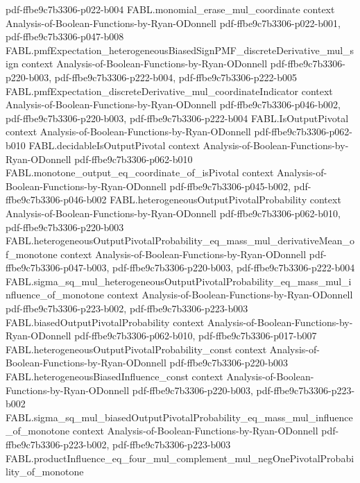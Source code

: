 \begin{theorem}
  {pdf-ffbe9c7b3306-p022-b004}
\proofstep
  {FABL.monomial_erase_mul_coordinate}
  {context}
  {Analysis-of-Boolean-Functions-by-Ryan-ODonnell}
  {pdf-ffbe9c7b3306-p022-b001,
    pdf-ffbe9c7b3306-p047-b008}
\proofstep
  {FABL.pmfExpectation_heterogeneousBiasedSignPMF_discreteDerivative_mul_sign}
  {context}
  {Analysis-of-Boolean-Functions-by-Ryan-ODonnell}
  {pdf-ffbe9c7b3306-p220-b003,
    pdf-ffbe9c7b3306-p222-b004,
    pdf-ffbe9c7b3306-p222-b005}
\proofstep
  {FABL.pmfExpectation_discreteDerivative_mul_coordinateIndicator}
  {context}
  {Analysis-of-Boolean-Functions-by-Ryan-ODonnell}
  {pdf-ffbe9c7b3306-p046-b002,
    pdf-ffbe9c7b3306-p220-b003,
    pdf-ffbe9c7b3306-p222-b004}
\proofstep
  {FABL.IsOutputPivotal}
  {context}
  {Analysis-of-Boolean-Functions-by-Ryan-ODonnell}
  {pdf-ffbe9c7b3306-p062-b010}
\proofstep
  {FABL.decidableIsOutputPivotal}
  {context}
  {Analysis-of-Boolean-Functions-by-Ryan-ODonnell}
  {pdf-ffbe9c7b3306-p062-b010}
\proofstep
  {FABL.monotone_output_eq_coordinate_of_isPivotal}
  {context}
  {Analysis-of-Boolean-Functions-by-Ryan-ODonnell}
  {pdf-ffbe9c7b3306-p045-b002,
    pdf-ffbe9c7b3306-p046-b002}
\proofstep
  {FABL.heterogeneousOutputPivotalProbability}
  {context}
  {Analysis-of-Boolean-Functions-by-Ryan-ODonnell}
  {pdf-ffbe9c7b3306-p062-b010,
    pdf-ffbe9c7b3306-p220-b003}
\proofstep
  {FABL.heterogeneousOutputPivotalProbability_eq_mass_mul_derivativeMean_of_monotone}
  {context}
  {Analysis-of-Boolean-Functions-by-Ryan-ODonnell}
  {pdf-ffbe9c7b3306-p047-b003,
    pdf-ffbe9c7b3306-p220-b003,
    pdf-ffbe9c7b3306-p222-b004}
\proofstep
  {FABL.sigma_sq_mul_heterogeneousOutputPivotalProbability_eq_mass_mul_influence_of_monotone}
  {context}
  {Analysis-of-Boolean-Functions-by-Ryan-ODonnell}
  {pdf-ffbe9c7b3306-p223-b002,
    pdf-ffbe9c7b3306-p223-b003}
\proofstep
  {FABL.biasedOutputPivotalProbability}
  {context}
  {Analysis-of-Boolean-Functions-by-Ryan-ODonnell}
  {pdf-ffbe9c7b3306-p062-b010,
    pdf-ffbe9c7b3306-p017-b007}
\proofstep
  {FABL.heterogeneousOutputPivotalProbability_const}
  {context}
  {Analysis-of-Boolean-Functions-by-Ryan-ODonnell}
  {pdf-ffbe9c7b3306-p220-b003}
\proofstep
  {FABL.heterogeneousBiasedInfluence_const}
  {context}
  {Analysis-of-Boolean-Functions-by-Ryan-ODonnell}
  {pdf-ffbe9c7b3306-p220-b003,
    pdf-ffbe9c7b3306-p223-b002}
\proofstep
  {FABL.sigma_sq_mul_biasedOutputPivotalProbability_eq_mass_mul_influence_of_monotone}
  {context}
  {Analysis-of-Boolean-Functions-by-Ryan-ODonnell}
  {pdf-ffbe9c7b3306-p223-b002,
    pdf-ffbe9c7b3306-p223-b003}
\proofstep
  {FABL.productInfluence_eq_four_mul_complement_mul_negOnePivotalProbability_of_monotone}

\end{theorem}
